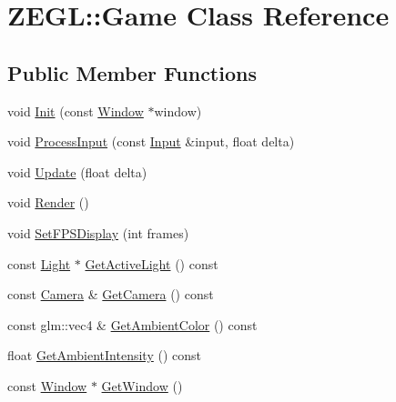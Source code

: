 \hypertarget{class_z_e_g_l_1_1_game}{}\section{Z\+E\+G\+L\+:\+:Game Class Reference}
\label{class_z_e_g_l_1_1_game}
\subsection*{Public Member Functions}
\begin{DoxyCompactItemize}
\item 
void \hyperlink{class_z_e_g_l_1_1_game_a08afc15e9896fef7f294f90d736d24cd}{Init} (const \hyperlink{class_z_e_g_l_1_1_window}{Window} $\ast$window)
\item 
void \hyperlink{class_z_e_g_l_1_1_game_ab64891eae2c4eb4f3bf7d161c6d5e37a}{Process\+Input} (const \hyperlink{class_z_e_g_l_1_1_input}{Input} \&input, float delta)
\item 
void \hyperlink{class_z_e_g_l_1_1_game_a6ad207394e4ce91f909d49c87802da08}{Update} (float delta)
\item 
void \hyperlink{class_z_e_g_l_1_1_game_a0897730fc9fed789f6c0f11d21a0c14a}{Render} ()
\item 
void \hyperlink{class_z_e_g_l_1_1_game_a38773e42c90201c4d8ca079ce54c4402}{Set\+F\+P\+S\+Display} (int frames)
\item 
const \hyperlink{class_z_e_g_l_1_1_light}{Light} $\ast$ \hyperlink{class_z_e_g_l_1_1_game_a82f5be49774c3ad1a96daac71eb0ddec}{Get\+Active\+Light} () const 
\item 
const \hyperlink{class_z_e_g_l_1_1_camera}{Camera} \& \hyperlink{class_z_e_g_l_1_1_game_a65c6ec575fef37dd386fa0534f6cad86}{Get\+Camera} () const 
\item 
const glm\+::vec4 \& \hyperlink{class_z_e_g_l_1_1_game_a82963ff86de3c1a1969f32de12c3863e}{Get\+Ambient\+Color} () const 
\item 
float \hyperlink{class_z_e_g_l_1_1_game_adb8a60aa109a04a92c3aee2065f79702}{Get\+Ambient\+Intensity} () const 
\item 
const \hyperlink{class_z_e_g_l_1_1_window}{Window} $\ast$ \hyperlink{class_z_e_g_l_1_1_game_a12474b22720b2559db897cd83b7dffce}{Get\+Window} ()
\end{DoxyCompactItemize}
